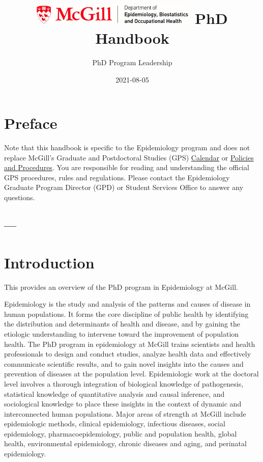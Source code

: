 \documentclass[
]{book}
\title{\includegraphics[width=3.125in,height=\textheight]{mcgill-epi-logo.png} PhD Handbook}
\author{PhD Program Leadership}
\date{2021-08-05}
\begin{document}
\maketitle

{
\setcounter{tocdepth}{1}
\tableofcontents
}
\hypertarget{preface}{%
\chapter*{Preface}\label{preface}}

Note that this handbook is specific to the Epidemiology program and does not replace McGill's Graduate and Postdoctoral Studies (GPS) \href{https://www.mcgill.ca/students/courses/calendars/}{Calendar} or \href{https://www.mcgill.ca/gps/students/policies-and-guidelines}{Policies and Procedures}. You are responsible for reading and understanding the official GPS procedures, rules and regulations. Please contact the Epidemiology Graduate Program Director (GPD) or Student Services Office to answer any questions.

\hypertarget{section}{%
\section{---}\label{section}}

\hypertarget{introduction}{%
\chapter{Introduction}\label{introduction}}

This provides an overview of the PhD program in Epidemiology at McGill.

Epidemiology is the study and analysis of the patterns and causes of disease in human populations. It forms the core discipline of public health by identifying the distribution and determinants of health and disease, and by gaining the etiologic understanding to intervene toward the improvement of population health. The PhD program in epidemiology at McGill trains scientists and health professionals to design and conduct studies, analyze health data and effectively communicate scientific results, and to gain novel insights into the causes and prevention of diseases at the population level. Epidemiologic work at the doctoral level involves a thorough integration of biological knowledge of pathogenesis, statistical knowledge of quantitative analysis and causal inference, and sociological knowledge to place these insights in the context of dynamic and interconnected human populations. Major areas of strength at McGill include epidemiologic methods, clinical epidemiology, infectious diseases, social epidemiology, pharmacoepidemiology, public and population health, global health, environmental epidemiology, chronic diseases and aging, and perinatal epidemiology.
\end{document}
